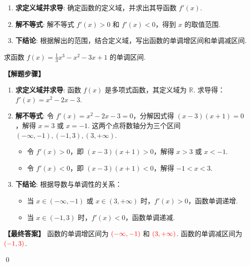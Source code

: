 \begin{note}[导数法三步流程]
	\begin{enumerate}
		\item \textbf{求定义域并求导}: 确定函数的定义域，并求出其导函数 $f'(x)$.
		\item \textbf{解不等式}: 解不等式 $f'(x)>0$ 和 $f'(x)<0$，得到 $x$ 的取值范围.
		\item \textbf{下结论}: 根据解出的范围，结合定义域，写出函数的单调增区间和单调减区间.
	\end{enumerate}
\end{note}

\begin{exercise}
	求函数 $f(x) = \frac{1}{3}x^3 - x^2 - 3x + 1$ 的单调区间.
\end{exercise}
\begin{solution}
	\textbf{【解题步骤】}
	\begin{enumerate}
		\item \textbf{求定义域并求导}:
		函数 $f(x)$ 是多项式函数，其定义域为 $\mathbb{R}$.
		求导得：$f'(x) = x^2 - 2x - 3$.
		
		\item \textbf{解不等式}:
		令 $f'(x) = x^2 - 2x - 3 = 0$，分解因式得 $(x-3)(x+1)=0$，解得 $x=3$ 或 $x=-1$.
		这两个点将数轴分为三个区间 $(-\infty, -1), (-1, 3), (3, +\infty)$.
		\begin{itemize}
			\item 令 $f'(x) > 0$，即 $(x-3)(x+1)>0$，解得 $x > 3$ 或 $x < -1$.
			\item 令 $f'(x) < 0$，即 $(x-3)(x+1)<0$，解得 $-1 < x < 3$.
		\end{itemize}
		
		\item \textbf{下结论}:
		根据导数与单调性的关系：
		\begin{itemize}
			\item 当 $x \in (-\infty, -1)$ 或 $x \in (3, +\infty)$ 时，$f'(x)>0$，函数单调递增.
			\item 当 $x \in (-1, 3)$ 时，$f'(x)<0$，函数单调递减.
		\end{itemize}
	\end{enumerate}
	\textbf{【最终答案】}
	函数的单调增区间为 $\textcolor{red}{(-\infty, -1)}$ 和 $\textcolor{red}{(3, +\infty)}$.
	函数的单调减区间为 $\textcolor{red}{(-1, 3)}$.
\end{solution}
\qed

